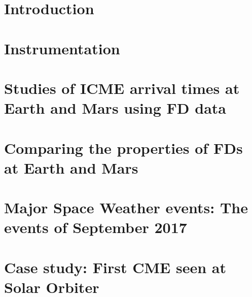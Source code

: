 \documentclass[ twoside,openright,titlepage,numbers=noenddot,headinclude,%
footinclude=true,cleardoublepage=empty,abstractoff, %
BCOR=10mm,paper=a4,fontsize=11pt,%
ngerman,american]{scrreprt} %
\begin{document}
\frenchspacing
\raggedbottom
{} %
\pagestyle{plain}



\cleardoublepage

\cleardoublepage

%
\cleardoublepage



\cleardoublepage
{}
\setcounter{page}{1}	

\chapter{Introduction}



\chapter{Instrumentation}



\chapter{Studies of ICME arrival times at Earth and Mars using FD data}



\chapter{Comparing the properties of FDs at Earth and Mars}



\chapter{Major Space Weather events: The events of September 2017}



\chapter{Case study: First CME seen at Solar Orbiter}
\end{document}
